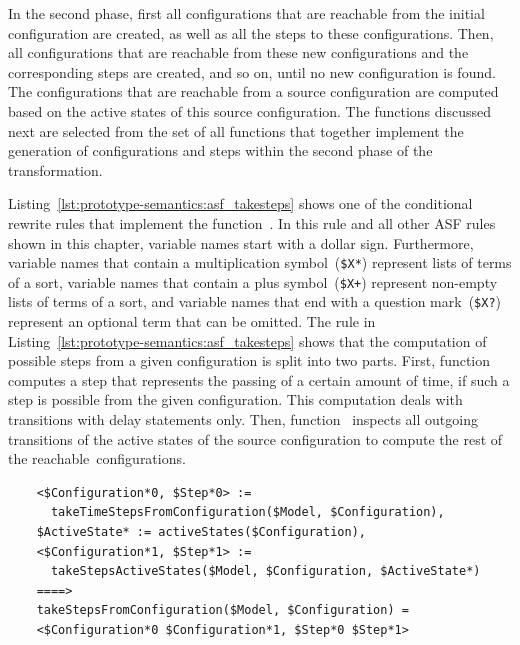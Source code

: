 In the second phase, first all configurations that are reachable from the initial configuration are created, as well as all the steps to these configurations.
Then, all configurations that are reachable from these new configurations and the corresponding steps are created, and so on, until no new configuration is found.
The configurations that are reachable from a source configuration are computed based on the active states of this source configuration.
The \ASFSDF functions discussed next are selected from the set of all functions that together implement the generation of configurations and steps within the second phase of the transformation.

Listing~\ref{lst:prototype-semantics:asf_takesteps} shows one of the conditional rewrite rules that implement the function~.
In this rule and all other ASF rules shown in this chapter, variable names start with a dollar sign.
Furthermore, variable names that contain a multiplication symbol~(\texttt{\$X*}) represent lists of terms of a sort,
variable names that contain a plus symbol~(\texttt{\$X+}) represent non-empty lists of terms of a sort,
and variable names that end with a question mark~(\texttt{\$X?}) represent an optional term that can be omitted.
The rule in Listing~\ref{lst:prototype-semantics:asf_takesteps} shows that the computation of possible steps from a given configuration is split into two parts.
First, function~ computes a step that represents the passing of a certain amount of time, if such a step is possible from the given configuration.
This computation deals with transitions with delay statements only.
Then, function~ inspects all outgoing transitions of the active states of the source configuration to compute the rest of the reachable~configurations.

\begin{listing}
  \lstset{
    language=asf,
    style=asf,
    caption=ASF rule that computes reachable configuration and the corresponding steps,
    label=lst:prototype-semantics:asf_takesteps,
    numbers=none
  }
  \begin{lstlisting}
    <$Configuration*0, $Step*0> :=
      takeTimeStepsFromConfiguration($Model, $Configuration),
    $ActiveState* := activeStates($Configuration),
    <$Configuration*1, $Step*1> :=
      takeStepsActiveStates($Model, $Configuration, $ActiveState*)
    ====>
    takeStepsFromConfiguration($Model, $Configuration) =
    <$Configuration*0 $Configuration*1, $Step*0 $Step*1>
  \end{lstlisting}
\end{listing}

